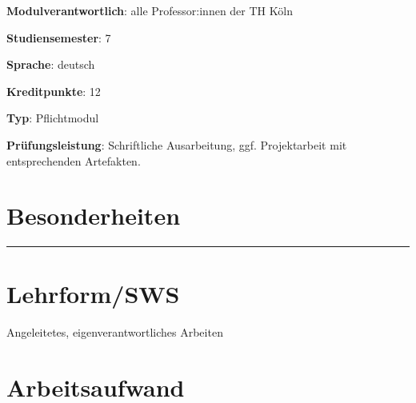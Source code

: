 \begin{modulHead}
\textbf{Modulverantwortlich}: alle Professor:innen
der TH Köln
\end{modulHead}
\begin{modulHead}
\textbf{Studiensemester}:
7
\end{modulHead}
\begin{modulHead}
\textbf{Sprache}:
deutsch
\end{modulHead}
\begin{modulHead}
\textbf{Kreditpunkte}:
12
\end{modulHead}
\begin{modulHead}
\textbf{Typ}:
Pflichtmodul
\end{modulHead}
\begin{modulHead}
\textbf{Prüfungsleistung}:
Schriftliche Ausarbeitung, ggf. Projektarbeit mit entsprechenden
Artefakten.
\end{modulHead}


\hypertarget{besonderheitenpathlabel....srcmodulbeschreibungen-bachelor-bpo5ba_bachelorarbeit}{%
\section*{Besonderheiten\label{../../src/modulbeschreibungen-bachelor-bpo5/BA_Bachelorarbeit}}\label{besonderheitenpathlabel....srcmodulbeschreibungen-bachelor-bpo5ba_bachelorarbeit}}

\begin{center}\rule{0.5\linewidth}{0.5pt}\end{center}

\hypertarget{lehrformswspathlabel....srcmodulbeschreibungen-bachelor-bpo5ba_bachelorarbeit}{%
\section*{Lehrform/SWS\label{../../src/modulbeschreibungen-bachelor-bpo5/BA_Bachelorarbeit}}\label{lehrformswspathlabel....srcmodulbeschreibungen-bachelor-bpo5ba_bachelorarbeit}}

Angeleitetes, eigenverantwortliches Arbeiten

\hypertarget{arbeitsaufwandpathlabel....srcmodulbeschreibungen-bachelor-bpo5ba_bachelorarbeit}{%
\section*{Arbeitsaufwand\label{../../src/modulbeschreibungen-bachelor-bpo5/BA_Bachelorarbeit}}\label{arbeitsaufwandpathlabel....srcmodulbeschreibungen-bachelor-bpo5ba_bachelorarbeit}}


